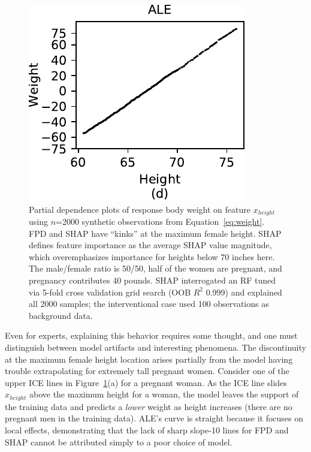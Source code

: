 \documentclass[]{article} %
\renewcommand{\eqref}[1]{Equation~\ref{#1}}
\newcommand{\figref}[1]{Figure~\ref{#1}}
\begin{document}
\begin{figure}[!htbp]
\begin{center}
\includegraphics[scale=0.46]{images/height_ale.pdf}\vspace{-2mm}
\caption{\small Partial dependence plots of response body weight on feature $x_{height}$ using $n$=2000 synthetic observations from \eqref{eq:weight}. FPD and SHAP have ``kinks'' at the maximum female height. SHAP defines feature importance as the average SHAP value magnitude, which overemphasizes importance for heights below 70 inches here. The male/female ratio is 50/50, half of the women are pregnant, and pregnancy contributes 40 pounds. SHAP interrogated an RF tuned via 5-fold cross validation grid search (OOB $R^2$ 0.999) and explained all 2000 samples; the interventional case used 100 observations as background data.}
\label{fig:heightweight}
\end{center}
\end{figure}

Even for experts, explaining this behavior requires some thought, and one must distinguish between model artifacts and interesting phenomena. The discontinuity at the maximum female height location arises partially from the model having trouble extrapolating for extremely tall pregnant women. Consider one of the upper ICE lines in \figref{fig:heightweight}(a) for a pregnant woman. As the ICE line slides $x_{height}$ above the maximum height for a woman, the model leaves the support of the training data and predicts a {\em lower} weight as height increases (there are no pregnant men in the training data). ALE's curve is straight because it focuses on local effects, demonstrating that the lack of sharp slope-10 lines for FPD and SHAP cannot be attributed simply to a poor choice of model.  
\end{document}
